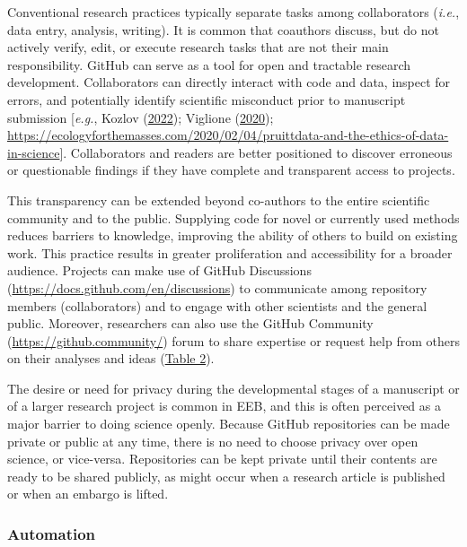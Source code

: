 Conventional research practices typically separate tasks among collaborators (\emph{i.e.}, data entry, analysis, writing).
It is common that coauthors discuss, but do not actively verify, edit, or execute research tasks that are not their main responsibility.
GitHub can serve as a tool for open and tractable research development.
Collaborators can directly interact with code and data, inspect for errors, and potentially identify scientific misconduct prior to manuscript submission {[}\emph{e.g.}, Kozlov (\protect\hyperlink{ref-ut2crxgX}{2022}); Viglione (\protect\hyperlink{ref-crC1Mhe4}{2020}); \url{https://ecologyforthemasses.com/2020/02/04/pruittdata-and-the-ethics-of-data-in-science}{]}.
Collaborators and readers are better positioned to discover erroneous or questionable findings if they have complete and transparent access to projects.

This transparency can be extended beyond co-authors to the entire scientific community and to the public.
Supplying code for novel or currently used methods reduces barriers to knowledge, improving the ability of others to build on existing work.
This practice results in greater proliferation and accessibility for a broader audience.
Projects can make use of GitHub Discussions (\url{https://docs.github.com/en/discussions}) to communicate among repository members (collaborators) and to engage with other scientists and the general public.
Moreover, researchers can also use the GitHub Community (\url{https://github.community/}) forum to share expertise or request help from others on their analyses and ideas (\protect\hyperlink{tbl:roles}{Table 2}).

The desire or need for privacy during the developmental stages of a manuscript or of a larger research project is common in EEB, and this is often perceived as a major barrier to doing science openly.
Because GitHub repositories can be made private or public at any time, there is no need to choose privacy over open science, or vice-versa.
Repositories can be kept private until their contents are ready to be shared publicly, as might occur when a research article is published or when an embargo is lifted.

\hypertarget{automation}{%
\subsubsection{Automation}\label{automation}}

